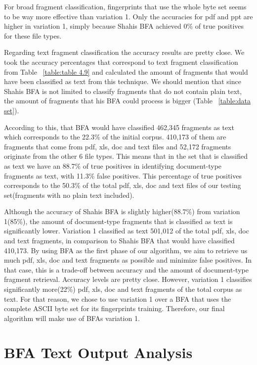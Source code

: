 
  
 For broad fragment classification, fingerprints that use the whole byte set seems to be way more effective than variation 1. Only the accuracies for pdf and ppt are higher in variation 1, simply because Shahis BFA achieved 0\% of true positives for these file types.
 
Regarding text fragment classification the accuracy results are pretty close. We took the accuracy percentages that correspond to text fragment classification from Table ~\ref{table:table 4.9} and calculated the amount of fragments that would have been classified as text from this technique. We should mention that since Shahis BFA is not limited to classify fragments that do not contain plain text, the amount of fragments that his BFA could process is bigger (Table ~\ref{table:data set}).

 According to this, that BFA would have classified 462,345 fragments as text which corresponds to the 22.3\% of the initial corpus. 410,173 of them are fragments that come from pdf, xls, doc and text files and 52,172 fragments originate from the other 6 file types. This means that in the set that is classified as text we have an 88.7\% of true positives in identifying document-type fragments as text, with 11.3\% false positives. This percentage of true positives corresponds to the 50.3\% of the total pdf, xls, doc and text files of our testing set(fragments with no plain text included).
 
Although the accuracy of Shahis BFA is slightly higher(88.7\%) from variation 1(85\%), the amount of document-type fragments that is classified as text is significantly lower. Variation 1 classified as text 501,012 of the total pdf, xls, doc and text fragments, in comparison to Shahis BFA that would have classified 410,173. By using BFA as the first phase of our algorithm, we aim to retrieve us much pdf, xls, doc and text fragments as possible and minimize false positives. In that case, this is a trade-off between accuracy and the amount of document-type fragment retrieval. Accuracy levels are pretty close. However, variation 1 classifies significantly more(22\%) pdf, xls, doc and text fragments of the total corpus as text. For that reason, we chose to use variation 1 over a BFA that uses the complete ASCII byte set for its fingerprints training. Therefore, our final algorithm will make use of BFAs variation 1.
 \pagebreak
\section{BFA Text Output Analysis} 

